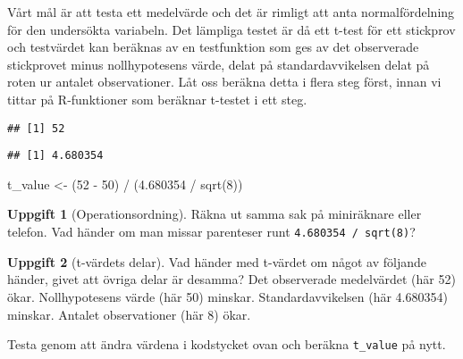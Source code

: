 \documentclass[
]{book}
\newenvironment{Shaded}{\begin{snugshade}}{\end{snugshade}}
\newcommand{\DecValTok}[1]{\textcolor[rgb]{0.00,0.00,0.81}{#1}}
\newcommand{\FloatTok}[1]{\textcolor[rgb]{0.00,0.00,0.81}{#1}}
\newcommand{\FunctionTok}[1]{\textcolor[rgb]{0.00,0.00,0.00}{#1}}
\newcommand{\NormalTok}[1]{#1}
\newcommand{\OtherTok}[1]{\textcolor[rgb]{0.56,0.35,0.01}{#1}}
\newcommand{\SpecialCharTok}[1]{\textcolor[rgb]{0.00,0.00,0.00}{#1}}
\theoremstyle{definition}
\theoremstyle{definition}
\theoremstyle{definition}
\newtheorem{exercise}{Uppgift}[chapter]
\theoremstyle{definition}
\theoremstyle{remark}
\begin{document}
Vårt mål är att testa ett medelvärde och det är rimligt att anta normalfördelning för den undersökta variabeln. Det lämpliga testet är då ett t-test för ett stickprov och testvärdet kan beräknas av en testfunktion som ges av det observerade stickprovet minus nollhypotesens värde, delat på standardavvikelsen delat på roten ur antalet observationer. Låt oss beräkna detta i flera steg först, innan vi tittar på R-funktioner som beräknar t-testet i ett steg.

\begin{Shaded}
\end{Shaded}

\begin{verbatim}
## [1] 52
\end{verbatim}

\begin{Shaded}
\end{Shaded}

\begin{verbatim}
## [1] 4.680354
\end{verbatim}

\begin{Shaded}
\begin{Highlighting}[]
\NormalTok{t\_value }\OtherTok{\textless{}{-}}\NormalTok{ (}\DecValTok{52} \SpecialCharTok{{-}} \DecValTok{50}\NormalTok{) }\SpecialCharTok{/}\NormalTok{ (}\FloatTok{4.680354} \SpecialCharTok{/} \FunctionTok{sqrt}\NormalTok{(}\DecValTok{8}\NormalTok{))}
\end{Highlighting}
\end{Shaded}

\begin{exercise}[Operationsordning]
Räkna ut samma sak på miniräknare eller telefon. Vad händer om man missar parenteser runt \texttt{4.680354\ /\ sqrt(8)}?
\end{exercise}

\begin{exercise}[t-värdets delar]
Vad händer med t-värdet om något av följande händer, givet att övriga delar är desamma? Det observerade medelvärdet (här 52) ökar. Nollhypotesens värde (här 50) minskar. Standardavvikelsen (här 4.680354) minskar. Antalet observationer (här 8) ökar.

Testa genom att ändra värdena i kodstycket ovan och beräkna \texttt{t\_value} på nytt.
\end{exercise}
\end{document}

